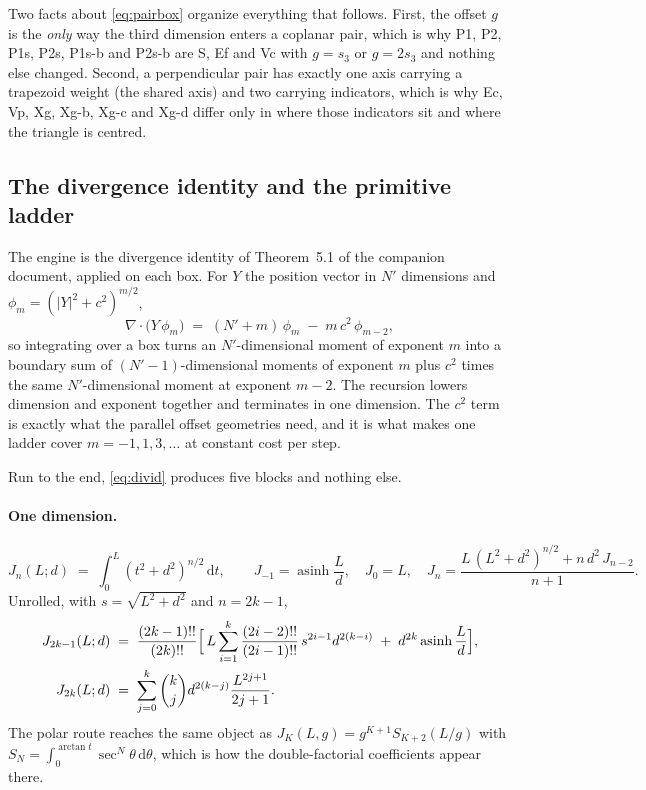 \documentclass[11pt]{article}
\theoremstyle{remark}
\newcommand{\dd}{\mathrm{d}}
\newcommand{\asinh}{\operatorname{asinh}}
\begin{document}
Two facts about \eqref{eq:pairbox} organize everything that follows. First, the offset
$g$ is the \emph{only} way the third dimension enters a coplanar pair, which is why P1,
P2, P1s, P2s, P1s-b and P2s-b are S, Ef and Vc with $g = s_3$ or $g = 2s_3$ and nothing
else changed. Second, a perpendicular pair has exactly one axis carrying a trapezoid
weight (the shared axis) and two carrying indicators, which is why Ec, Vp, Xg, Xg-b, Xg-c
and Xg-d differ only in where those indicators sit and where the triangle is centred.

\subsection{The divergence identity and the primitive ladder}
\label{sec:ladder}

The engine is the divergence identity of Theorem~5.1 of the companion document, applied on
each box. For $Y$ the position vector in $N'$ dimensions and $\phi_m = (|Y|^2+c^2)^{m/2}$,
\begin{equation}
\nabla\cdot\bigl(Y\,\phi_m\bigr) \;=\; (N'+m)\,\phi_m \;-\; m\,c^2\,\phi_{m-2},
\label{eq:divid}
\end{equation}
so integrating over a box turns an $N'$-dimensional moment of exponent $m$ into a boundary
sum of $(N'-1)$-dimensional moments of exponent $m$ plus $c^2$ times the same
$N'$-dimensional moment at exponent $m-2$. The recursion lowers dimension and exponent
together and terminates in one dimension. The $c^2$ term is exactly what the parallel
offset geometries need, and it is what makes one ladder cover $m = -1, 1, 3,\ldots$ at
constant cost per step.

Run to the end, \eqref{eq:divid} produces five blocks and nothing else.

\paragraph{One dimension.}
\begin{equation}
J_n(L;d) \;=\; \int_0^L (t^2+d^2)^{n/2}\,\dd t,
\qquad
J_{-1} = \asinh\frac{L}{d},\quad J_0 = L,\quad
J_n = \frac{L\,(L^2+d^2)^{n/2} + n\,d^2\,J_{n-2}}{n+1}.
\label{eq:J}
\end{equation}
Unrolled, with $s = \sqrt{L^2+d^2}$ and $n = 2k-1$,
\begin{equation}
\begin{aligned}
J_{2k-1}(L;d) &\;=\; \frac{(2k-1)!!}{(2k)!!}\Bigl[\,L\sum_{i=1}^{k}\frac{(2i-2)!!}{(2i-1)!!}\,s^{2i-1}d^{2(k-i)}
\;+\; d^{2k}\asinh\frac{L}{d}\Bigr],\\
J_{2k}(L;d) &\;=\; \sum_{j=0}^{k}\binom{k}{j}d^{2(k-j)}\frac{L^{2j+1}}{2j+1}.
\end{aligned}
\label{eq:Junroll}
\end{equation}
The polar route reaches the same object as $J_K(L,g) = g^{K+1}S_{K+2}(L/g)$ with
$S_N = \int_0^{\arctan t}\sec^N\theta\,\dd\theta$, which is how the double-factorial
coefficients appear there.
\end{document}
